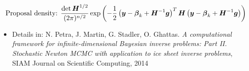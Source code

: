 \documentclass[10pt,final,xcolor=dvipsnames]{beamer}
\newcommand{\bs}[1]{\ensuremath{\boldsymbol{#1}}}
\newcommand{\tcdb}[1]{\textcolor{darkblue}{{#1}}}
\begin{document}
\begin{frame}
 \begin{align*}
     \mbox{ Proposal density: } \frac { \det \bs H^{1/2} }{(2\pi)^{n/2} }
      \exp \left( - \frac 12 \left( \proposal - \bs{\beta}_k + \bs H^{-1} \bs
      g \right) ^T \bs H \left( \proposal - \bs{\beta}_k + \bs H^{-1} \bs g \right)
      \right)
 \end{align*}
 
\begin{itemize}
\item [] \scriptsize{Details in: N. Petra, J. Martin, G. Stadler,
  O. Ghattas. {\em A computational framework for
    infinite-dimensional Bayesian inverse problems: Part
    II. Stochastic Newton MCMC with application to ice sheet inverse
    problems}, SIAM Journal on Scientific Computing, 2014}
\end{itemize}

\end{frame}
\end{document}
